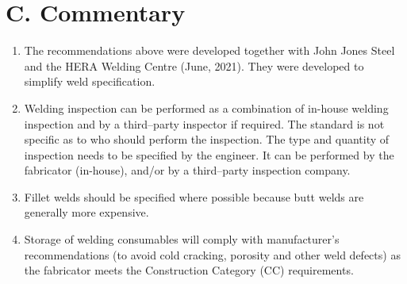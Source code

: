 \section*{C. Commentary}
\begin{enumerate}
\item The recommendations above were developed together with John Jones Steel and the HERA Welding Centre (June, 2021). They were developed to simplify weld specification.
\item Welding inspection can be performed as a combination of in-house welding inspection and by a third--party inspector if required. The standard is not specific as to who should perform the inspection. The type and quantity of inspection needs to be specified by the engineer. It can be performed by the fabricator (in-house), and/or by a third--party inspection company.
\item Fillet welds should be specified where possible because butt welds are generally more expensive.
\item Storage of welding consumables will comply with manufacturer's recommendations (to avoid cold cracking, porosity and other weld defects) as the fabricator meets the Construction Category (CC) requirements.
\end{enumerate}